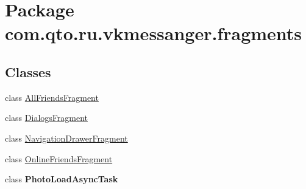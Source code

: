 \hypertarget{namespacecom_1_1qto_1_1ru_1_1vkmessanger_1_1fragments}{}\section{Package com.\+qto.\+ru.\+vkmessanger.\+fragments}
\label{namespacecom_1_1qto_1_1ru_1_1vkmessanger_1_1fragments}
\subsection*{Classes}
\begin{DoxyCompactItemize}
\item 
class \hyperlink{classcom_1_1qto_1_1ru_1_1vkmessanger_1_1fragments_1_1_all_friends_fragment}{All\+Friends\+Fragment}
\item 
class \hyperlink{classcom_1_1qto_1_1ru_1_1vkmessanger_1_1fragments_1_1_dialogs_fragment}{Dialogs\+Fragment}
\item 
class \hyperlink{classcom_1_1qto_1_1ru_1_1vkmessanger_1_1fragments_1_1_navigation_drawer_fragment}{Navigation\+Drawer\+Fragment}
\item 
class \hyperlink{classcom_1_1qto_1_1ru_1_1vkmessanger_1_1fragments_1_1_online_friends_fragment}{Online\+Friends\+Fragment}
\item 
class {\bfseries Photo\+Load\+Async\+Task}
\end{DoxyCompactItemize}
